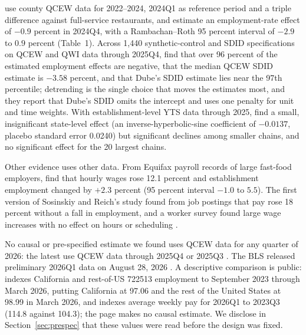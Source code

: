 \citet{sosinskiy2026effects} use county QCEW data for 2022--2024, 2024Q1 as reference period and a
triple difference against full-service restaurants, and estimate an employment-rate effect of
$-0.9$ percent in 2024Q4, with a Rambachan--Roth 95 percent interval of $-2.9$ to $0.9$ percent
(Table~1). Across 1,440 synthetic-control and SDID specifications on QCEW and QWI data through
2025Q4, \citet{clemens2026synthetic} find that over 96 percent of the estimated employment effects
are negative, that the median QCEW SDID estimate is $-3.58$ percent, and that Dube's SDID
estimate lies near the 97th percentile; detrending is the single choice that moves the estimates
most, and they report that Dube's SDID omits the intercept and uses one penalty for unit and time
weights. With establishment-level YTS data through 2025, \citet{melo2026covered} find a small,
insignificant state-level effect (an inverse-hyperbolic-sine coefficient of $-0.0137$, placebo %
standard error 0.0240) but significant declines among smaller chains, and no significant effect %
for the 20 largest chains.

Other evidence uses other data. From Equifax payroll records of large fast-food employers,
\citet{hamdi2025wage} find that hourly wages rose 12.1 percent and establishment employment
changed by $+2.3$ percent (95 percent interval $-1.0$ to $5.5$). The first version of
Sosinskiy and Reich's study \citep{reich2024sectoral} found from job postings that pay rose 18
percent without a fall in employment, and a worker survey found large wage increases with no
effect on hours or scheduling \citep{schneider2024early}.

No causal or pre-specified estimate we found uses QCEW data for any quarter of 2026: the latest
use QCEW data through 2025Q4 \citep{clemens2026synthetic} or 2025Q3
\citep{dube2026labor,clemens2026employment}. The BLS released preliminary 2026Q1 data on August
28, 2026 \citep{bls2026cewq1}. A descriptive comparison is public: \citet{steier2026recordinglaw}
indexes California and rest-of-US 722513 employment to September 2023 through March 2026, putting
California at 97.06 and the rest of the United States at 98.99 in March 2026, and indexes average
weekly pay for 2026Q1 to 2023Q3 (114.8 against 104.3); the page makes no causal estimate. We
disclose in Section~\ref{sec:prespec} that these values were read before the design was fixed.

